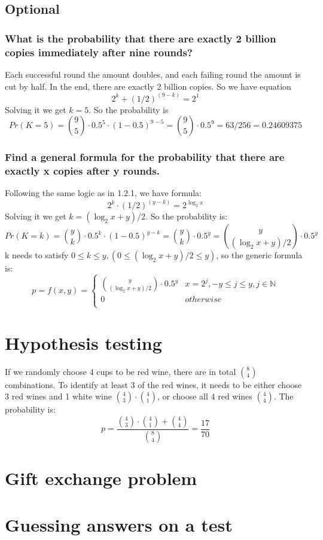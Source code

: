 \documentclass{article}
\begin{document}
\subsection{Optional}
\subsubsection{What is the probability that there are exactly 2 billion copies immediately after nine rounds?}

Each successful round the amount doubles, and each failing round the amount is cut by half. In the end, there are exactly 2 billion copies. So we have equation\\
\[ 2^k + (1/2)^(9-k) = 2^1 \]
Solving it we get \( k = 5 \). So the probability is \\
\[
Pr(K = 5) = {9 \choose 5} \cdot 0.5^5 \cdot (1-0.5)^{9-5} = {9 \choose 5} \cdot 0.5^9 = 63/256 = 0.24609375
\]

\subsubsection{Find a general formula for the probability that there are exactly x copies after y rounds.}
Following the same logic as in 1.2.1, we have formula: \\
\[
2^k \cdot (1/2)^{(y-k)} = 2^{\log_2 x}
\]
Solving it we get \( k = ({\log_2 x} + y)/2 \). So the probability is:\\
\[
Pr(K = k) = {y \choose k} \cdot 0.5^k \cdot (1 - 0.5)^{y-k} = {y \choose k} \cdot 0.5^y = 
{y \choose ({\log_2 x} + y )/2} \cdot 0.5^y
\]
k needs to satisfy \( 0 \leq k \leq y , (0 \leq ({\log_2 x} + y )/2 \leq y)\), so the generic formula is:\\
\[
p = f(x,y) = \left\{
\begin{array}{ll}
      {y \choose ({\log_2 x} + y )/2} \cdot 0.5^y & x = 2^j, -y \leq j \leq y, j \in \mathbb{N} \\
      0 & otherwise\\
\end{array} 
\right.
\]

\section{Hypothesis testing}
If we randomly choose 4 cups to be red wine, there are in total \( {8 \choose 4 }\) combinations.
To identify at least 3 of the red wines, it needs to be either choose 3 red wines and 1 white wine \( {4 \choose 3} \cdot {4 \choose 1}\), or choose all 4 red wines \( {4 \choose 4 }\).
The probability is:\\
\[
p = \frac{{4 \choose 3} \cdot {4 \choose 1} + {4 \choose 4}}{{8 \choose 4}} = \frac{17}{70}
\]

\section{Gift exchange problem}


\section{Guessing answers on a test}
\end{document}
